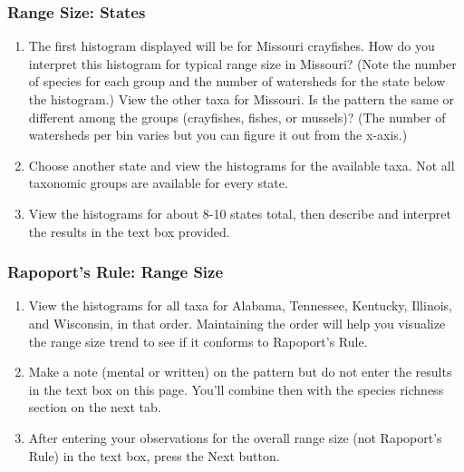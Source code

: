 \documentclass[11pt]{article}
\begin{document}
\subsubsection*{Range Size: States}


\begin{enumerate}[resume]
	
	\item The first histogram displayed will be for Missouri crayfishes. How do you interpret this 
	histogram for typical range size in Missouri? (Note the number of species for each group and 
	the number of watersheds for the state below the histogram.) View the other taxa for Missouri. 
	Is the pattern the same or different among the groups (crayfishes, fishes, or mussels)? (The 
	number of watersheds per bin varies but you can figure it out from the x-axis.)
	
	\item Choose another state and view the histograms for the available taxa. Not all taxonomic groups
	are available for every state.
	
	\item View the histograms for about 8-10 states total, then describe and interpret the results in the
	text box provided.

\end{enumerate}

\subsubsection*{Rapoport's Rule: Range Size}

\begin{enumerate}[resume]
		
	\item View the histograms for all taxa for Alabama, Tennessee, Kentucky, Illinois, and Wisconsin, in that order. Maintaining the order will help you visualize the range size trend to see if it conforms
	to Rapoport's Rule.
	
	\item Make a note (mental or written) on the pattern but do not enter the results in the text box on
	this page. You'll combine then with the species richness section on the next tab.
	
	\item After entering your observations for the overall range size (not Rapoport's Rule) in the text
	box, press the Next button.
	
\end{enumerate}
\end{document}
